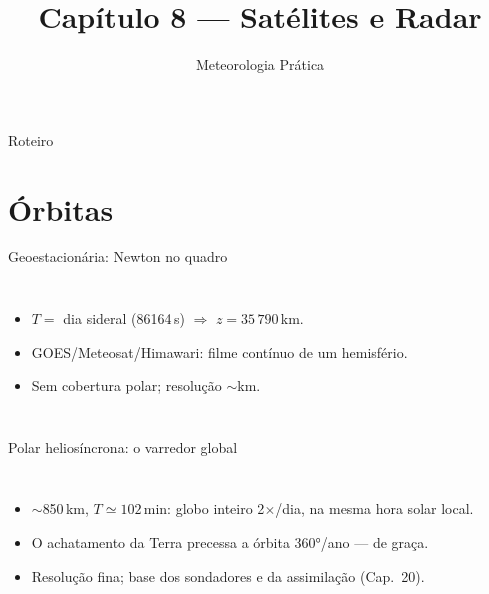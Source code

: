 \documentclass[aspectratio=169,11pt]{beamer}
\title[Cap. 8 --- Satélites e Radar]{Capítulo 8 --- Satélites e Radar}
\subtitle{Meteorologia Prática}
\author{}
\date{}
\begin{document}
\begin{frame}
  \titlepage
  \vfill
  \atribuicao
\end{frame}

\begin{frame}{Roteiro}
  \tableofcontents
\end{frame}

\section{Órbitas}

\begin{frame}{Geoestacionária: Newton no quadro}
  \begin{columns}
    \vspace{0.4em}
    \begin{itemize}
      \item $T = $ dia \alert{sideral} (86164\,s) $\Rightarrow$
            $z = 35\,790$\,km.
      \item GOES/Meteosat/Himawari: filme contínuo de um hemisfério.
      \item Sem cobertura polar; resolução $\sim$km.
    \end{itemize}
  \end{columns}
\end{frame}

\begin{frame}{Polar heliosíncrona: o varredor global}
  \begin{columns}
    \begin{itemize}
      \item $\sim$850\,km, $T \simeq 102$\,min: globo inteiro
            2$\times$/dia, na \alert{mesma hora solar local}.
      \item O achatamento da Terra precessa a órbita $360°$/ano — de
            graça.
      \item Resolução fina; base dos sondadores e da assimilação
            (Cap.~20).
    \end{itemize}
  \end{columns}
\end{frame}
\end{document}

